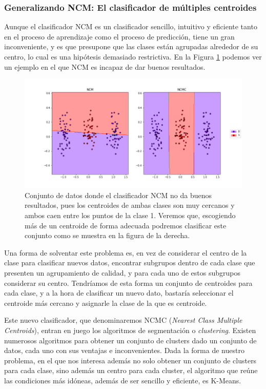 \subsubsection{Generalizando NCM: El clasificador de múltiples centroides}

Aunque el clasificador NCM es un clasificador sencillo, intuitivo y eficiente tanto en el proceso de aprendizaje como el proceso de predicción, tiene un gran inconveniente, y es que presupone que las clases están agrupadas alrededor de su centro, lo cual es una hipótesis demasiado restrictiva. En la Figura \ref{fig:problema_ncm} podemos ver un ejemplo en el que NCM es incapaz de dar buenos resultados.

\begin{figure}[h]
    \centering
    \includegraphics[width=1.0\textwidth]{images/ncm_problem.png}
    \caption{Conjunto de datos donde el clasificador NCM no da buenos resultados, pues los centroides de ambas clases son muy cercanos y ambos caen entre los puntos de la clase 1. Veremos que, escogiendo más de un centroide de forma adecuada podremos clasificar este conjunto como se muestra en la figura de la derecha.} \label{fig:problema_ncm}
\end{figure}

Una forma de solventar este problema es, en vez de considerar el centro de la clase para clasificar nuevos datos, encontrar subgrupos dentro de cada clase que presenten un agrupamiento de calidad, y para cada uno de estos subgrupos considerar su centro. Tendríamos de esta forma un conjunto de centroides para cada clase, y a la hora de clasificar un nuevo dato, bastaría seleccionar el centroide más cercano y asignarle la clase de la que es centroide.

Este nuevo clasificador, que denominaremos NCMC (\emph{Nearest Class Multiple Centroids}), entran en juego los algoritmos de segmentación o \emph{clustering}. Existen numerosos algoritmos \cite{clustering_algorithms} para obtener un conjunto de clusters dado un conjunto de datos, cada uno con sus ventajas e inconvenientes. Dada la forma de nuestro problema, en el que nos interesa además no solo obtener un conjunto de clusters para cada clase, sino además un centro para cada cluster, el algoritmo que reúne las condiciones más idóneas, además de ser sencillo y eficiente, es K-Means.

